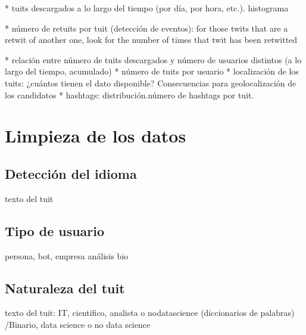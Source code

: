 * tuits descargados a lo largo del tiempo (por día, por hora, etc.). histograma

* número de retuits por tuit (detección de eventos): for those twits that are a retwit of another one, look for the number of times that twit has been retwitted

* relación entre número de tuits descargados y número de usuarios distintos (a lo largo del tiempo, acumulado)
* número de tuits por usuario
* localización de los tuits: ¿cuántos tienen el dato disponible? Consecuencias para geolocalización de los candidatos
* hashtags: distribución.número de hashtags por tuit.


\section{Limpieza de los datos}
\label{sect:limpieza_de_los_datos}

\subsection{Detección del idioma} 
texto del tuit
\subsection{Tipo de usuario}
persona, bot, empresa análisis bio
\subsection{Naturaleza del tuit}
texto del tuit:  IT, cientifico, analista o nodatascience (diccionarios de palabras)
					/Binario, data science o no data science

